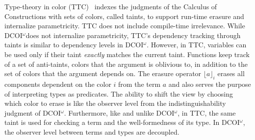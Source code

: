\documentclass[acmsmall, screen=true, nonacm=true,
  review=\ifpublic false\else true\fi,
  anonymous=\ifanonymous true\else false\fi
]{acmart}
\makeatletter
\newcommand{\name}{\texorpdfstring{DCOI$^{\omega}$\@\xspace}{DCOI-omega}}
\makeatother
\begin{document}


Type-theory in color (TTC)~\citep{bernardy:color} indexes the judgments of the
Calculus of Constructions with sets of colors, called taints, to support run-time erasure
and internalize parametricity. TTC does not include compile-time irrelevance. 
While \name does not internalize parametricity, TTC's 
dependency tracking through taints is similar to dependency levels in \name.
However, in TTC, variables can be used only if their
taint \emph{exactly} matches the current taint. Functions keep track of a
set of anti-taints, colors that the argument is oblivious to, in
addition to the set of colors that the argument depends on.
The erasure operator $\lfloor a
\rfloor_i$ erases all components dependent on the color $i$ from the
term $a$ and also serves the purpose of interpreting types as
predicates. The ability to shift the view by choosing which color to erase is like
the observer level from the indistinguishability
judgment of \name. 
Furthermore, like \citet{pfenning:modal,
abel:irrelevance} and unlike \name, in TTC, the same taint is used for
checking a term and the well-formedness of its type. In \name, the
observer level between terms and types are decoupled.


\end{document}

